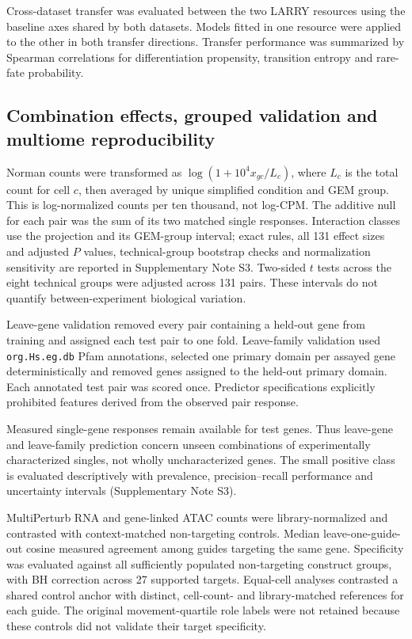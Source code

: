 \documentclass[a4paper,fleqn]{cas-sc}
\makeatletter
\DeclareRobustCommand{\rev}[1]{{\color{red}\def\@citecolor{black}\def\@linkcolor{red}\def\@urlcolor{red}#1}}
\makeatother
\begin{document}
Cross-dataset transfer was evaluated between the two LARRY resources using the baseline axes shared by both datasets. Models fitted in one resource were applied to the other in both transfer directions. Transfer performance was summarized by Spearman correlations for differentiation propensity, transition entropy and rare-fate probability.

\subsection*{Combination effects, grouped validation and multiome reproducibility}

Norman counts were transformed as $\log(1+10^4 x_{gc}/L_c)$, where $L_c$ is the total count for cell $c$, then averaged by unique simplified condition and GEM group. This is log-normalized counts per ten thousand, not log-CPM. The additive null for each pair was the sum of its two matched single responses. Interaction classes use the projection and its GEM-group interval; exact rules, all 131 effect sizes and adjusted $P$ values, technical-group bootstrap checks and normalization sensitivity are reported in Supplementary Note S3. Two-sided $t$ tests across the eight technical groups were adjusted across 131 pairs. These intervals do not quantify between-experiment biological variation.

Leave-gene validation removed every pair containing a held-out gene from training and assigned each test pair to one fold. Leave-family validation used \texttt{org.Hs.eg.db} Pfam annotations, selected one primary domain per assayed gene deterministically and removed genes assigned to the held-out primary domain. Each annotated test pair was scored once. Predictor specifications explicitly prohibited features derived from the observed pair response.

Measured single-gene responses remain available for test genes. Thus leave-gene and leave-family prediction concern unseen combinations of experimentally characterized singles, not wholly uncharacterized genes. The small positive class is evaluated descriptively with prevalence, precision--recall performance and uncertainty intervals (Supplementary Note S3).

\rev{MultiPerturb RNA and gene-linked ATAC counts were library-normalized and contrasted with context-matched non-targeting controls.} \rev{Median leave-one-guide-out cosine measured agreement among guides targeting the same gene.} \rev{Specificity was evaluated against all sufficiently populated non-targeting construct groups, with BH correction across 27 supported targets.} \rev{Equal-cell analyses contrasted a shared control anchor with distinct, cell-count- and library-matched references for each guide.} \rev{The original movement-quartile role labels were not retained because these controls did not validate their target specificity.}
\end{document}
